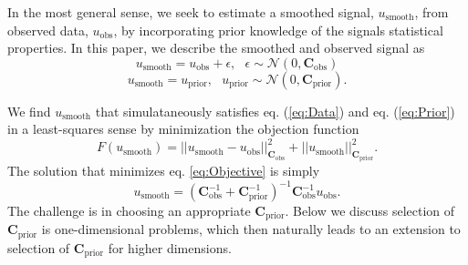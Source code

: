 \documentclass[10pt,a4paper]{article}
\begin{document}
In the most general sense, we seek to estimate a smoothed signal, $u_\mathrm{smooth}$, from observed data, $u_\mathrm{obs}$, by incorporating prior knowledge of the signals statistical properties.  In this paper, we describe the smoothed and observed signal as 
\begin{equation}\label{eq:Data}
  u_\mathrm{smooth} = u_\mathrm{obs} + \epsilon,\ \ \ \epsilon \sim \mathcal{N}(0,\mathbf{C}_\mathrm{obs})
\end{equation}
\begin{equation}\label{eq:Prior}
  u_\mathrm{smooth} = u_\mathrm{prior}, \ \ \ u_\mathrm{prior} \sim \mathcal{N}(0,\mathbf{C}_\mathrm{prior}).
\end{equation}

We find $u_\mathrm{smooth}$ that simulataneously satisfies eq. (\ref{eq:Data}) and eq. (\ref{eq:Prior}) in a least-squares sense by minimization the objection function
\begin{equation}\label{eq:Objective}
F(u_\mathrm{smooth}) = ||u_\mathrm{smooth} - u_\mathrm{obs}||_{\mathbf{C}_\mathrm{obs}}^2 + 
                       ||u_\mathrm{smooth}||_{\mathbf{C}_\mathrm{prior}}^2 .
\end{equation} 
The solution that minimizes eq. \ref{eq:Objective} is simply
\begin{equation}\label{eq:GeneralSolution}
u_\mathrm{smooth} = (\mathbf{C}_\mathrm{obs}^{-1} + 
                     \mathbf{C}_\mathrm{prior}^{-1})^{-1}
                     \mathbf{C}_\mathrm{obs}^{-1} u_\mathrm{obs} .
\end{equation} 
The challenge is in choosing an appropriate $\mathbf{C}_\mathrm{prior}$.  Below we discuss selection of $\mathbf{C}_\mathrm{prior}$ is one-dimensional problems, which then naturally leads to an extension to selection of $\mathbf{C}_\mathrm{prior}$ for higher dimensions.
\end{document}
